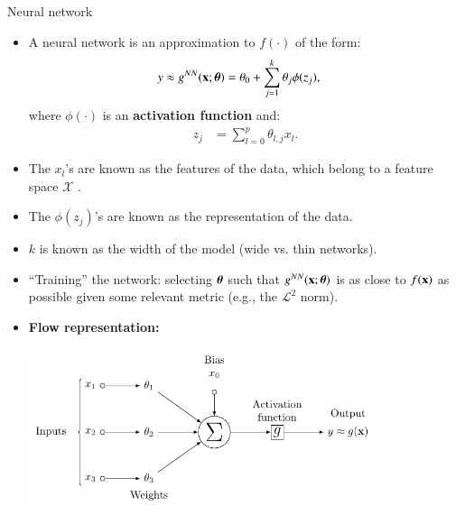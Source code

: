 \documentclass[notes, ignorenonframetext, compress, 10pt, xcolor=svgnames, aspectratio=169]{beamer}
\begin{document}
\begin{frame}[allowframebreaks]{Neural network}
\begin{itemize}
\item A neural network is an approximation to $ f(\cdot)$ of the form:
\begin{align*}
y &\approx g^{NN}({\mathbf x}; {\boldsymbol \theta}) = \theta_0 + \sum_{j=1}^k\theta_j\phi(z_j),
\end{align*}
where $\phi(\cdot)$ is an \textbf{activation function} and:
\begin{align*}
z_j &= \sum_{l=0}^p \theta_{l, j}x_l.
\end{align*}
\item The $x_l$'s  are known as the features of the data, which belong to a feature space $\mathcal{X}$ .
\item The $\phi(z_j)$’s are known as the representation of the data.
\item $k$ is known as the width of the model (wide vs. thin networks).
\item “Training” the network: selecting ${\boldsymbol \theta}$ such that $g^{NN}({\mathbf x}; {\boldsymbol \theta})$ is as close to $f ({\mathbf x}) $ as possible given some
relevant metric (e.g., the $\mathcal{L}^2$ norm).

\framebreak

\item \textbf{Flow representation:}

\begin{center}
 \includegraphics[width=0.8\textwidth]{../../Ressources/Figs/Fig_multilayerNet_3.pdf}\\
\end{center}
\end{itemize}

\end{frame}
\end{document}
